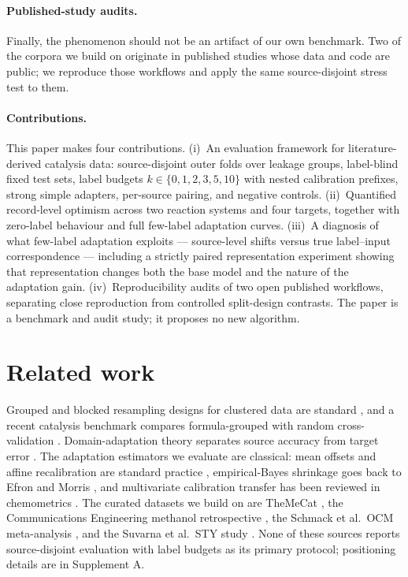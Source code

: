 \documentclass[11pt,a4paper]{article}
\begin{document}
\paragraph{Published-study audits.} Finally, the phenomenon should not be an artifact of
our own benchmark. Two of the corpora we build on originate in published studies whose
data and code are public; we reproduce those workflows and apply the same
source-disjoint stress test to them.

\paragraph{Contributions.} This paper makes four contributions. (i)~An evaluation
framework for literature-derived catalysis data: source-disjoint outer folds over
leakage groups, label-blind fixed test sets, label budgets $k\in\{0,1,2,3,5,10\}$ with
nested calibration prefixes, strong simple adapters, per-source pairing, and negative
controls. (ii)~Quantified record-level optimism across two reaction systems and four
targets, together with zero-label behaviour and full few-label adaptation curves.
(iii)~A diagnosis of what few-label adaptation exploits --- source-level shifts versus
true label--input correspondence --- including a strictly paired representation
experiment showing that representation changes both the base model and the nature of the
adaptation gain. (iv)~Reproducibility audits of two open published workflows, separating
close reproduction from controlled split-design contrasts. The paper is a benchmark and
audit study; it proposes no new algorithm.

\section{Related work}
Grouped and blocked resampling designs for clustered data are standard
\cite{roberts}, and a recent catalysis benchmark compares formula-grouped with random
cross-validation \cite{wu}. Domain-adaptation theory separates source accuracy from
target error \cite{bendavid}. The adaptation estimators we evaluate are classical:
mean offsets and affine recalibration are standard practice \cite{steyerberg2019},
empirical-Bayes shrinkage goes back to Efron and Morris \cite{efron}, and
multivariate calibration transfer has been reviewed in chemometrics \cite{feudale}.
The curated datasets we build on are TheMeCat \cite{toldy}, the Communications
Engineering methanol retrospective \cite{yan}, the Schmack et al.\ OCM meta-analysis
\cite{schmack}, and the Suvarna et al.\ STY study \cite{suvarna}. None of these
sources reports source-disjoint evaluation with label budgets as its primary protocol;
positioning details are in Supplement A.
\end{document}
